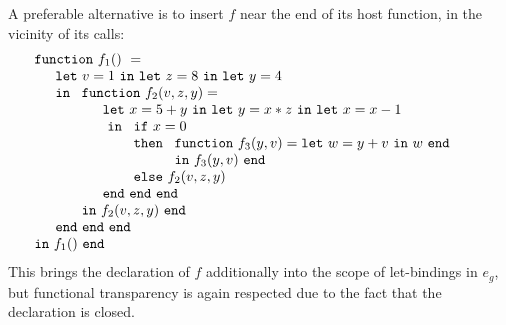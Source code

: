 A preferable alternative is to insert $f$ near the end of its host
function, in the vicinity of its calls:
\begin{equation}
\label{FunctionalConstructionProgram4}
\begin{array}{l}
\mathtt{function}\ f_1()\ = \\
  \quad
  \begin{array}{l}
     \mathtt{let}\ v = 1 \ 
     \mathtt{in\ let}\ z = 8 \ 
     \mathtt{in\ let}\ y = 4\\
     \mathtt{in}\ 
     \begin{array}[t]{l}
       \mathtt{function}\ f_2(v,z,y) =\\
         \quad
         \begin{array}{l}
           \mathtt{let}\ x = 5+y\
           \mathtt{in\ let}\ y = x*z\
           \mathtt{in\ let}\ x = x-1\\\
           \mathtt{in}\
           \begin{array}[t]{l}
             \mathtt{if}\ x=0\\ 
             \mathtt{then}\ 
               \begin{array}[t]{l}
                 \mathtt{function}\ f_3(y,v) = 
                 \mathtt{let}\ w = y+v\ \mathtt{in}\ w\ \mathtt{end}\\
                 \mathtt{in}\ f_3(y,v)\ \mathtt{end}
               \end{array}\\
             \mathtt{else}\ f_2(v,z,y)
           \end{array}\\
           \mathtt{end\ end\ end}
         \end{array}\\
     \mathtt{in}\ f_2(v,z,y)\ \mathtt{end}
     \end{array}\\
     \mathtt{end\ end\ end}\\
   \end{array}\\
\mathtt{in}\ f_1()\  \mathtt{end}
\end{array}
\end{equation}
This brings the declaration of $f$ additionally into the scope of
let-bindings in $e_g$, but functional transparency is again respected
due to the fact that the declaration is closed.

